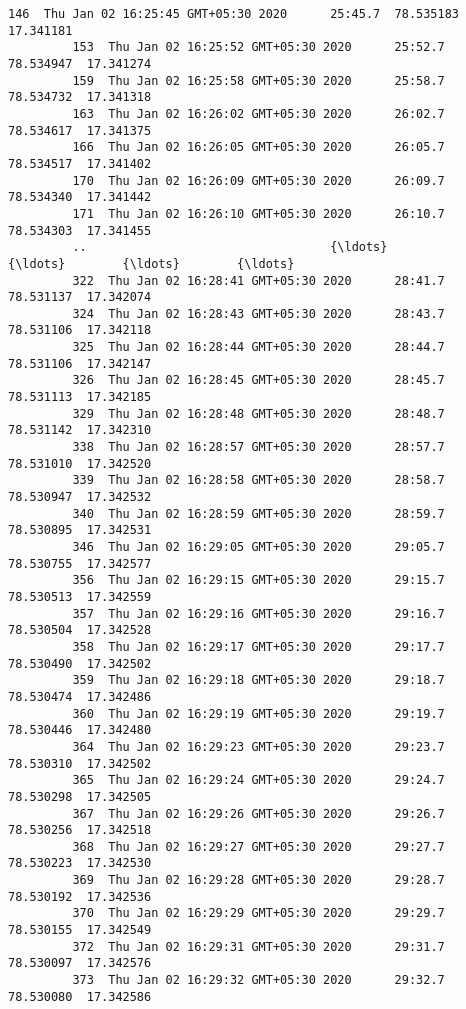 \documentclass[11pt]{article}
\begin{document}
\begin{Verbatim}[commandchars=\\\{\}]
         146  Thu Jan 02 16:25:45 GMT+05:30 2020      25:45.7  78.535183  17.341181   
         153  Thu Jan 02 16:25:52 GMT+05:30 2020      25:52.7  78.534947  17.341274   
         159  Thu Jan 02 16:25:58 GMT+05:30 2020      25:58.7  78.534732  17.341318   
         163  Thu Jan 02 16:26:02 GMT+05:30 2020      26:02.7  78.534617  17.341375   
         166  Thu Jan 02 16:26:05 GMT+05:30 2020      26:05.7  78.534517  17.341402   
         170  Thu Jan 02 16:26:09 GMT+05:30 2020      26:09.7  78.534340  17.341442   
         171  Thu Jan 02 16:26:10 GMT+05:30 2020      26:10.7  78.534303  17.341455   
         ..                                  {\ldots}          {\ldots}        {\ldots}        {\ldots}   
         322  Thu Jan 02 16:28:41 GMT+05:30 2020      28:41.7  78.531137  17.342074   
         324  Thu Jan 02 16:28:43 GMT+05:30 2020      28:43.7  78.531106  17.342118   
         325  Thu Jan 02 16:28:44 GMT+05:30 2020      28:44.7  78.531106  17.342147   
         326  Thu Jan 02 16:28:45 GMT+05:30 2020      28:45.7  78.531113  17.342185   
         329  Thu Jan 02 16:28:48 GMT+05:30 2020      28:48.7  78.531142  17.342310   
         338  Thu Jan 02 16:28:57 GMT+05:30 2020      28:57.7  78.531010  17.342520   
         339  Thu Jan 02 16:28:58 GMT+05:30 2020      28:58.7  78.530947  17.342532   
         340  Thu Jan 02 16:28:59 GMT+05:30 2020      28:59.7  78.530895  17.342531   
         346  Thu Jan 02 16:29:05 GMT+05:30 2020      29:05.7  78.530755  17.342577   
         356  Thu Jan 02 16:29:15 GMT+05:30 2020      29:15.7  78.530513  17.342559   
         357  Thu Jan 02 16:29:16 GMT+05:30 2020      29:16.7  78.530504  17.342528   
         358  Thu Jan 02 16:29:17 GMT+05:30 2020      29:17.7  78.530490  17.342502   
         359  Thu Jan 02 16:29:18 GMT+05:30 2020      29:18.7  78.530474  17.342486   
         360  Thu Jan 02 16:29:19 GMT+05:30 2020      29:19.7  78.530446  17.342480   
         364  Thu Jan 02 16:29:23 GMT+05:30 2020      29:23.7  78.530310  17.342502   
         365  Thu Jan 02 16:29:24 GMT+05:30 2020      29:24.7  78.530298  17.342505   
         367  Thu Jan 02 16:29:26 GMT+05:30 2020      29:26.7  78.530256  17.342518   
         368  Thu Jan 02 16:29:27 GMT+05:30 2020      29:27.7  78.530223  17.342530   
         369  Thu Jan 02 16:29:28 GMT+05:30 2020      29:28.7  78.530192  17.342536   
         370  Thu Jan 02 16:29:29 GMT+05:30 2020      29:29.7  78.530155  17.342549   
         372  Thu Jan 02 16:29:31 GMT+05:30 2020      29:31.7  78.530097  17.342576   
         373  Thu Jan 02 16:29:32 GMT+05:30 2020      29:32.7  78.530080  17.342586   

\end{Verbatim}
\end{document}
